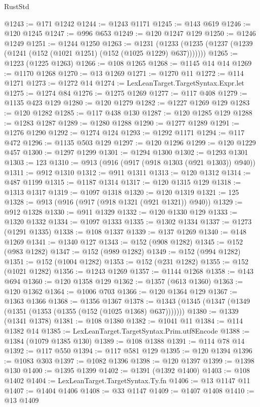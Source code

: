 \begin{lexlean}{RustStd}
\begin{coremodule}
@1243 := @171 @1242
@1244 := @1243 @1171
@1245 := @143 @619
@1246 := @120 @1245
@1247 := @996 @653
@1249 := @120 @1247 @129
@1250 := @1246 @1249
@1251 := @1244 @1250
@1263 := @1231
    (@1233 (@1235 (@1237 (@1239 (@1241 (@152 (@1021 @1251) (@152 (@1025 @1229) @637)))))))
@1265 := @1223 (@1225 @1263)
@1266 := @108 @1265
@1268 := @1145 @14 @14
@1269 := @1170 @1268
@1270 := @13 @1269
@1271 := @1270 @11
@1272 := @114 @1271
@1273 := @1272 @14
@1274 := LexLeanTarget.TargetSyntax.Expr.let
@1275 := @1274 @84
@1276 := @1275 @1269
@1277 := @117 @408
@1279 := @1135 @423 @129
@1280 := @120 @1279
@1282 := @1227 @1269 @129
@1283 := @120 @1282
@1285 := @117 @438 @130
@1287 := @120 @1285 @129
@1288 := @1283 @1287
@1289 := @1280 @1288
@1290 := @1277 @1289
@1291 := @1276 @1290
@1292 := @1274 @124
@1293 := @1292 @1171
@1294 := @117 @472
@1296 := @1135 @503 @129
@1297 := @120 @1296
@1299 := @120 @1229 @457
@1300 := @1297 @1299
@1301 := @1294 @1300
@1302 := @1293 @1301
@1303 := 123
@1310 := @913 (@916 (@917 (@918 @1303 (@921 @1303)) @940))
@1311 := @912 @1310
@1312 := @911 @1311
@1313 := @120 @1312
@1314 := @487 @1199
@1315 := @1187 @1314
@1317 := @120 @1315 @129
@1318 := @1313 @1317
@1319 := @1097 @1318
@1320 := @120 @1319
@1321 := 125
@1328 := @913 (@916 (@917 (@918 @1321 (@921 @1321)) @940))
@1329 := @912 @1328
@1330 := @911 @1329
@1332 := @120 @1330 @129
@1333 := @1320 @1332
@1334 := @1097 @1333
@1335 := @1302 @1334
@1337 := @1273 (@1291 @1335)
@1338 := @108 @1337
@1339 := @137 @1269
@1340 := @148 @1269
@1341 := @1340 @127
@1343 := @152 (@908 @1282)
@1345 := @152 (@983 @1282)
@1347 := @152 (@989 @1282)
@1349 := @152 (@994 @1282)
@1351 := @152 (@1004 @1282)
@1353 := @152 (@231 @1282)
@1355 := @152 (@1021 @1282)
@1356 := @1243 @1269
@1357 := @1144 @1268
@1358 := @143 @694
@1360 := @120 @1358 @129
@1362 := @1357 (@613 @1360)
@1363 := @120 @1362
@1364 := @1006 @703
@1366 := @120 @1364 @129
@1367 := @1363 @1366
@1368 := @1356 @1367
@1378 := @1343 (@1345 (@1347 (@1349 (@1351 (@1353 (@1355 (@152 (@1025 @1368) @637)))))))
@1380 := @1339 (@1341 @1378)
@1381 := @108 @1380
@1382 := @1041 @11
@1384 := @114 @1382 @14
@1385 := LexLeanTarget.TargetSyntax.Prim.utf8Encode
@1388 := @1384 (@1079 @1385 @130)
@1389 := @108 @1388
@1391 := @114 @78 @14
@1392 := @117 @550
@1394 := @117 @581 @129
@1395 := @120 @1394
@1396 := @1083 @303
@1397 := @1082 @1396
@1398 := @120 @1397
@1399 := @1398 @130
@1400 := @1395 @1399
@1402 := @1391 (@1392 @1400)
@1403 := @108 @1402
@1404 := LexLeanTarget.TargetSyntax.Ty.fn
@1406 := @13 @1147 @11
@1407 := @1404 @1406
@1408 := @33 @1147
@1409 := @1407 @1408
@1410 := @13 @1409

\end{coremodule}
\end{lexlean}
